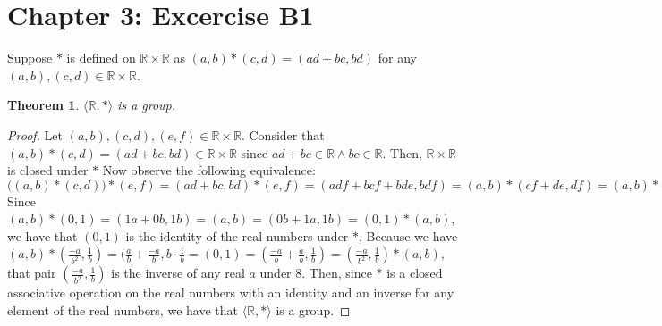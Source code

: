 \documentclass[12pt]{article}
\newcommand{\reals}{\mathbb{R}}
\newtheorem{thm}{Theorem}
\begin{document}
\section{Chapter 3: Excercise B1}

Suppose $*$ is defined on $\reals \times \reals$ as $(a,b) * (c,d) = (ad+bc,bd)$ for any $(a,b),(c,d) \in \reals \times \reals$.

\begin{thm}
	$\langle \reals, * \rangle$ is a group.
\end{thm}

\begin{proof}
	Let $(a,b),(c,d),(e,f) \in \reals \times \reals$.
	Consider that $(a,b) * (c,d) = (ad+bc,bd) \in \reals \times \reals$ since $ad+bc \in \reals \land bc \in \reals$. Then, $\reals \times \reals$ is closed under $*$
	Now observe the following equivalence: $\Big((a,b) * (c,d)\Big) * (e,f) = (ad+bc,bd) * (e,f) = (adf+bcf+bde,bdf) = (a,b) * (cf+de,df) = (a,b) * \Big((c,d) * (e,f)\Big)$
	Since $(a,b) * (0,1) = (1a+0b,1b) = (a,b) = (0b + 1a,1b) = (0,1) * (a,b)$, we have that $(0,1)$ is the identity of the real numbers under $*$,
	Because we have $(a,b)*(\frac{-a}{b^2},\frac{1}{b})=(\frac{a}{b}+\frac{-a}{b}, b \cdot \frac{1}{b} = (0,1) = (\frac{-a}{b}+\frac{a}{b},\frac{1}{b}) = (\frac{-a}{b^2},\frac{1}{b}) * (a,b)$, that pair $(\frac{-a}{b^2},\frac{1}{b})$ is the inverse of any real $a$ under $8$.
	Then, since $*$ is a closed associative operation on the real numbers with an identity and an inverse for any element of the real numbers, we have that $\langle \reals, * \rangle$ is a group.
	
\end{proof}
\end{document}
